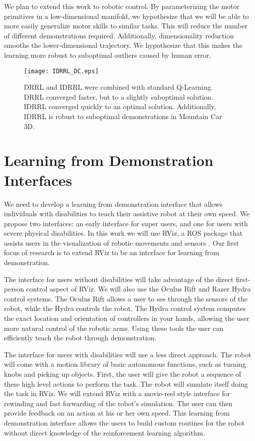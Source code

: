 \documentclass[letterpaper]{article}
\begin{document}
We plan to extend this work to robotic control. By parameterizing the motor primitives in a low-dimensional manifold, we hypothesize that we will be able to more easily generalize motor skills to similar tasks.  This will reduce the number of different demonstrations required. Additionally, dimensionality reduction smooths the lower-dimensional trajectory. We hypothesize that this makes the learning more robust to suboptimal outliers caused by human error. 

\begin{figure}[]
  \centering
      \texttt{[image: IDRRL\_DC.eps]}
  \caption{DRRL and IDRRL were combined with standard Q-Learning. DRRL converged faster, but to a slightly suboptimal solution. IDRRL converged quickly to an optimal solution. Additionally, IDRRL is robust to suboptimal demonstrations in Mountain Car 3D.}
  \label{fig:IDRRL_3DMountainCar}
\end{figure}

\section{Learning from Demonstration Interfaces}
\label{Learning by Demonstration}

We need to develop a learning from demonstration interface that allows individuals with disabilities to teach their assistive robot at their own speed. We propose two interfaces: an early interface for super users, and one for users with severe physical disabilities. In this work we will use RViz, a ROS package that assists users in the visualization of robotic movements and sensors \cite{quigley:ros}.  Our first focus of research is to extend RViz to be an interface for learning from demonstration. 

The interface for users without disabilities will take advantage of the direct first-person control aspect of RViz.  We will also use the Oculus Rift and Razer Hydra control systems. The Oculus Rift allows a user to see through the sensors of the robot, while the Hydra controls the robot. The Hydra control system computes the exact location and orientation of controllers in your hands, allowing the user more natural control of the robotic arms. Using these tools the user can efficiently teach the robot through demonstration.

The interface for users with disabilities will use a less direct approach. The robot will come with a motion library of basic autonomous functions, such as turning knobs and picking up objects. First, the user will give the robot a sequence of these high level actions to perform the task. The robot will simulate itself doing the task in RViz. We will extend RViz with a movie-reel style interface for rewinding and fast forwarding of the robot's simulation. The user can then provide feedback on an action at his or her own speed. This learning from demonstration interface allows the users to build custom routines for the robot without direct knowledge of the reinforcement learning algorithm.
\end{document}
